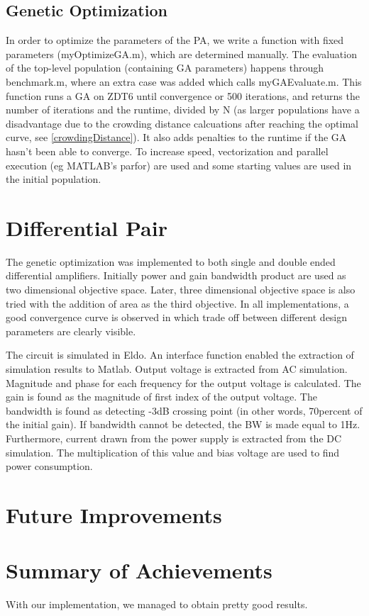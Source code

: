 \subsection{Genetic Optimization} 
In order to optimize the parameters of the PA, we write a function with fixed parameters (myOptimizeGA.m), which are determined manually.
The evaluation of the top-level population (containing GA parameters) happens through benchmark.m, where an extra case was added which calls myGAEvaluate.m.
This function runs a GA on ZDT6 until convergence or 500 iterations, and returns the number of iterations and the runtime, divided by N (as larger populations have a disadvantage due to the crowding distance calcuations after reaching the optimal curve, see \ref{crowdingDistance}). It also adds penalties to the runtime if the GA hasn't been able to converge.
To increase speed, vectorization and parallel execution (eg MATLAB's parfor) are used and some starting values are used in the initial population. \\

\section{Differential Pair} 

The genetic optimization was implemented to both single and double ended differential amplifiers. Initially power and gain bandwidth product are used as two dimensional objective space. Later, three dimensional objective space is also tried with the addition of area as the third objective. In all implementations, a good convergence curve is observed in which trade off between different design parameters are clearly visible. 

The circuit is simulated in Eldo. An interface function enabled the extraction of simulation results to Matlab. Output voltage is extracted from AC simulation. Magnitude and phase for each frequency for the output voltage is calculated. The gain is found as the magnitude of first index of the output voltage. The bandwidth is found as detecting -3dB crossing point (in other words, 70percent of the initial gain). If bandwidth cannot be detected, the BW is made equal to 1Hz. Furthermore, current drawn from the power supply is extracted from the DC simulation. The multiplication of this value and bias voltage are used to find power consumption.


\section{Future Improvements}
\section{Summary of  Achievements}\label{summary}

With our implementation, we managed to obtain pretty good results. 
